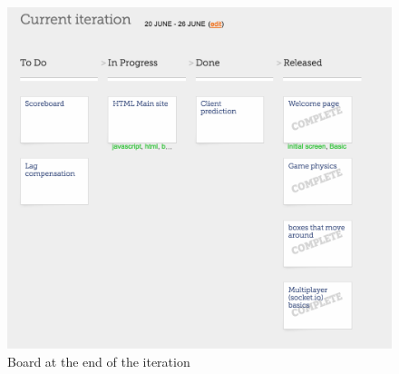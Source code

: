\documentclass{article}
\renewcommand{\_}{\char`_}
\begin{document}
\begin{figure}[ht]
\begin{minipage}[b]{0.5\linewidth}
    \centering
    \includegraphics[width=.85\linewidth]{end} 
    \caption{Board at the end of the iteration} 
    \vspace{4ex}
  \end{minipage} 
\end{figure}
\end{document}

